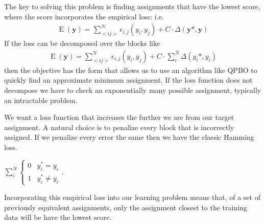 The key to solving this problem is finding assignments that have the
lowest score, where the score incorporates the empirical loss: i.e.
%
\begin{align}
\operatorname{E}(\mathbf{y}) = \sum_{<i j>}^{\mathcal{N}}\epsilon_{i,j}(y_i,y_j) + C\cdot\Delta(\mathbf{y}*,
\mathbf{y})
\end{align}
%
If the loss can be decomposed over the blocks like
%
\begin{align}
\operatorname{E}(\mathbf{y}) = \sum_{<i j>}^{\mathcal{N}}\epsilon_{i,j}(y_i,y_j) + C\cdot\sum_i^N\Delta(y_i*, y_i)
\end{align}
%
then the objective has the form that allows us to use an algorithm
like QPBO to quickly find an approximate minimum assignment. If the
loss function does not decompose we have to check an exponentially
many possible assignment, typically an intractable problem.

We want a loss function that increases the further we are from our
target assignment. A natural choice is to penalize every block that is
incorrectly assigned. If we penalize every error the same then we have
the classic Hamming loss. 

$\sum_i^N\begin{cases}
  0 &y_i^* = y_i \\
  1 &y_i^* \neq y_i
\end{cases}$. 

Incorporating this empirical loss into our learning problem means
that, of a set of previously equivalent assignments, only the
assignment closest to the training data will be have the lowest score.
